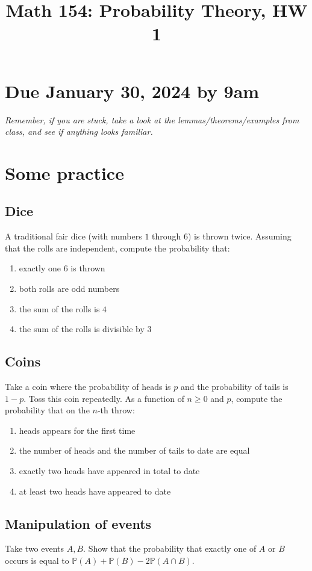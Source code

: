 \documentclass[12pt,reqno]{amsart}
\title{\Large Math 154: Probability Theory, HW 1\vspace{-0.1cm}}
\theoremstyle{definition}
\theoremstyle{remark}
\numberwithin{equation}{section}
\newenvironment{nouppercase}{%
  \let\uppercase\relax%
  \renewcommand{\uppercasenonmath}[1]{}}{}
\begin{document}
\begin{nouppercase}
\maketitle
\end{nouppercase}
\section*{Due January 30, 2024 by 9am}
\emph{Remember, if you are stuck, take a look at the lemmas/theorems/examples from class, and see if anything looks familiar.}
\section{Some practice}
\subsection{Dice}
A traditional fair dice (with numbers $1$ through $6$) is thrown twice. Assuming that the rolls are independent, compute the probability that:
\begin{enumerate}
\item exactly one $6$ is thrown
\item both rolls are odd numbers
\item the sum of the rolls is $4$
\item the sum of the rolls is divisible by $3$
\end{enumerate}
\subsection{Coins}
Take a coin where the probability of heads is $p$ and the probability of tails is $1-p$. Toss this coin repeatedly. As a function of $n\geq0$ and $p$, compute the probability that on the $n$-th throw:
\begin{enumerate}
\item heads appears for the first time
\item the number of heads and the number of tails to date are equal
\item exactly two heads have appeared in total to date
\item at least two heads have appeared to date
\end{enumerate}
\subsection{Manipulation of events}
Take two events $A,B$. Show that the probability that exactly one of $A$ or $B$ occurs is equal to $\mathbb{P}(A)+\mathbb{P}(B)-2\mathbb{P}(A\cap B)$.
\end{document}
